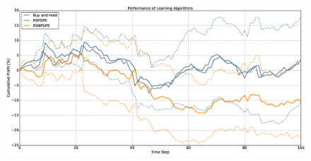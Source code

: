 \begin{figure}[t!]
	\centering
	\includegraphics[height=6cm,width=1.0\textwidth]{Images/8_11_single_hist_sensitive_performance}
	\caption[]{}
	\label{fig:}
\end{figure}

